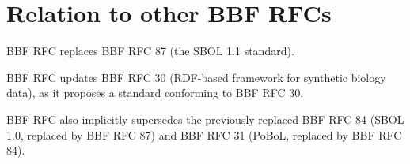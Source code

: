 \section{Relation to other BBF RFCs}

BBF RFC \rfcnum{} replaces BBF RFC 87 (the SBOL 1.1 standard).

BBF RFC \rfcnum{} updates BBF RFC 30 (RDF-based framework for synthetic biology data), as it proposes a standard conforming to BBF RFC 30.

BBF RFC \rfcnum{} also implicitly supersedes the previously replaced BBF RFC 84 (SBOL 1.0, replaced by BBF RFC 87) and BBF RFC 31 (PoBoL, replaced by BBF RFC 84).